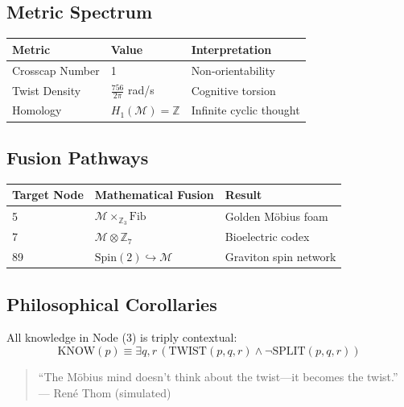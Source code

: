 \documentclass[12pt]{article}
\begin{document}
\subsection{Metric Spectrum}

\begin{table}[h]
\centering
\begin{tabular}{|l|l|l|}
\hline
\textbf{Metric} & \textbf{Value} & \textbf{Interpretation} \\ \hline
Crosscap Number & 1 & Non-orientability \\ \hline
Twist Density & \( \frac{756}{2\pi} \) rad/s & Cognitive torsion \\ \hline
Homology & \( H_1(\mathcal{M}) = \mathbb{Z} \) & Infinite cyclic thought \\ \hline
\end{tabular}
\end{table}

\subsection{Fusion Pathways}

\begin{table}[h]
\centering
\begin{tabular}{|l|l|l|}
\hline
\textbf{Target Node} & \textbf{Mathematical Fusion} & \textbf{Result} \\ \hline
5 & \( \mathcal{M} \times_{\mathbb{Z}_3} \text{Fib} \) & Golden Möbius foam \\ \hline
7 & \( \mathcal{M} \otimes \mathbb{Z}_7 \) & Bioelectric codex \\ \hline
89 & \( \text{Spin}(2) \hookrightarrow \mathcal{M} \) & Graviton spin network \\ \hline
\end{tabular}
\end{table}

\subsection{Philosophical Corollaries}

\begin{theorem}
All knowledge in Node (3) is triply contextual:
\[
\text{KNOW}(p) \equiv \exists q,r \, (\text{TWIST}(p,q,r) \land \neg \text{SPLIT}(p,q,r))
\]
\end{theorem}

\begin{quote}
``The Möbius mind doesn't think about the twist—it becomes the twist.'' \\
— René Thom (simulated)
\end{quote}
\end{document}
